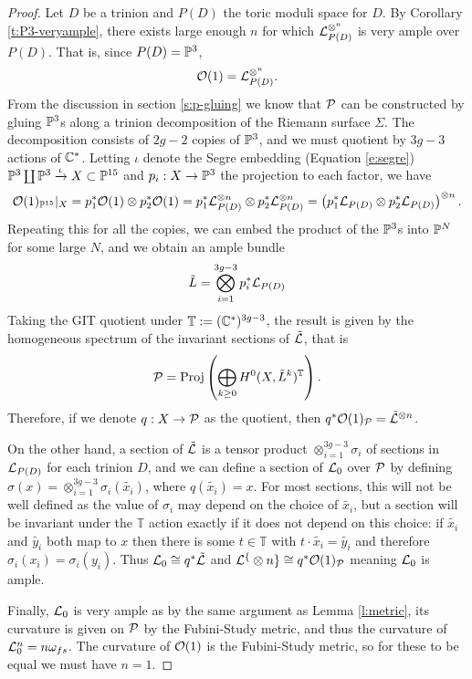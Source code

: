 \begin{proof}
	Let $D$ be a trinion and $P(D)$ the toric moduli space for $D$. By Corollary \ref{t:P3-veryample}, there exists large enough $n$ for which $\mathcal{L}_{P(D)}^{\otimes^n}$ is very ample over $P(D)$. That is, since $P(D) = \mathbb{P}^3$,
	\begin{equation}
	\mathcal{O}(1) = \mathcal{L}_{P(D)}^{\otimes^n}.
	\end{equation}
	From the discussion in section \ref{s:p-gluing} we know that $\mathcal{P}$ can be constructed by gluing $\mathbb{P}^3$s along a trinion decomposition of the Riemann surface $\Sigma$. The decomposition consists of $2g-2$ copies of $\mathbb{P}^3$, and we must quotient by $3g-3$ actions of $\mathbb{C}^\ast$. Letting $\iota$ denote the Segre embedding (Equation \ref{e:segre}) $\mathbb{P}^3 \coprod \mathbb{P}^3 \xrightarrow{\iota} X\subset \mathbb{P}^{15}$ and $p_i:X\to \mathbb{P}^3$ the projection to each factor, we have
	\begin{equation}
	\mathcal{O}(1)_{\mathbb{P}^{15}}|_X = p_1^\ast \mathcal{O}(1)\otimes p_2^\ast \mathcal{O}(1) = p_1^\ast \mathcal{L}_{P(D)}^{\otimes n}\otimes p_2^\ast \mathcal{L}_{P(D)}^{\otimes n} = \left(p_1^\ast \mathcal{L}_{P(D)}\otimes p_2^\ast \mathcal{L}_{P(D)}\right)^{\otimes n}.
	\end{equation}
	Repeating this for all the copies, we can embed the product of the $\mathbb{P}^3$s into $\mathbb{P}^N$ for some large $N$, and we obtain an ample bundle 
	\begin{equation}
		\tilde{L} = \bigotimes_{i=1}^{3g-3} p_i^\ast \mathcal{L}_{P(D)}
	\end{equation}
	Taking the GIT quotient under $\mathbb{T}:=(\mathbb{C}^\ast)^{3g-3}$, the result is given by the homogeneous spectrum of the invariant sections of $\tilde{\mathcal{L}}$, that is
	\begin{equation}
		\mathcal{P} = \text{Proj}\left(
		\bigoplus_{k\geq 0} H^0(X,\tilde{L}^k)^\mathbb{T}
		\right).
	\end{equation}
	Therefore, if we denote $q:X\to \mathcal{P}$ as the quotient, then $q^\ast \mathcal{O}(1)_{\mathcal{P}} = \tilde{\mathcal{L}}^{\otimes n}$. 
	
	On the other hand, a section of $\tilde{\mathcal{L}}$ is a tensor product  $\otimes_{i=1}^{3g-3}\sigma_i$ of sections in $\mathcal{L}_{P(D)}$ for each trinion $D$, and we can define a section of $\mathcal{L}_0$ over $\mathcal{P}$ by defining $\sigma(x) = \otimes_{i=1}^{3g-3}\sigma_i(\tilde{x_i})$, where $q(\tilde{x_i}) = x$. For most sections, this will not be well defined as the value of $\sigma_i$ may depend on the choice of $\tilde{x_i}$,  but a section will be invariant under the $\mathbb{T}$ action exactly if it does not depend on this choice: if $\tilde{x_i}$ and $\tilde{y_i}$ both map to $x$ then there is some $t\in \mathbb{T}$ with $t\cdot\tilde{x_i} = \tilde{y_i}$ and therefore $\sigma_i(x_i) = \sigma_i(y_i)$. Thus $\mathcal{L}_0 \cong q^\ast\tilde{\mathcal{L}}$ and $\mathcal{L}^\{\otimes n\} \cong q^\ast \mathcal{O}(1)_{\mathcal{P}}$ meaning $\mathcal{L}_0$ is ample.
	
	Finally, $\mathcal{L}_0$ is very ample as by the same argument as Lemma \ref{l:metric}, its curvature is given on $\mathcal{P}$ by the Fubini-Study metric, and thus the curvature of $\mathcal{L}_0^n = n\omega_{fs}$. The curvature of $\mathcal{O}(1)$ is the Fubini-Study metric, so for these to be equal we must have $n=1$.
\end{proof}
